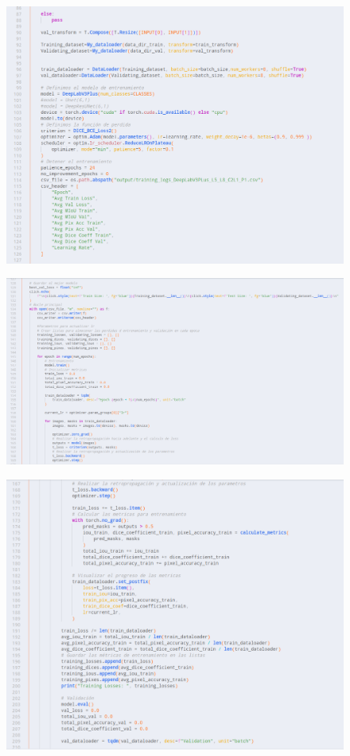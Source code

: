 \begin{figure}[h!]
	\centering
	\includegraphics[width=0.9\linewidth]{graficos/entrenamiento3}
\end{figure}

\begin{figure}[h!]
	\centering
	\includegraphics[width=0.9\linewidth]{graficos/entrenamiento4}
\end{figure}

\begin{figure}[h!]
	\centering
	\includegraphics[width=0.9\linewidth]{graficos/entrenamiento5}
\end{figure}

